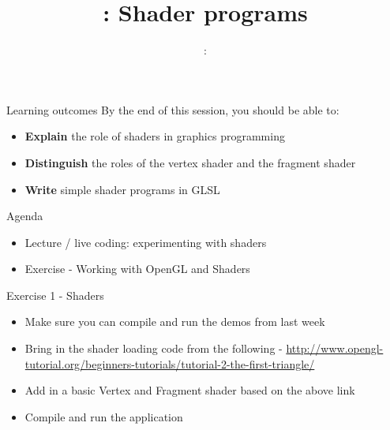 \usepackage{../../beamerthemeFalmouthGamesAcademy}
\usepackage{multimedia}
\graphicspath{ {../../} }




\usepackage[normalem]{ulem}
\usepackage{wasysym}

\usepackage{pdfpages}

\usetikzlibrary{arrows,automata}




\title{\sessionnumber: Shader programs}
\subtitle{\modulecode: \moduletitle}

\frame{\titlepage} 

\begin{frame}{Learning outcomes}
	By the end of this session, you should be able to:
	\begin{itemize}
		\item \textbf{Explain} the role of shaders in graphics programming
		\item \textbf{Distinguish} the roles of the vertex shader and the fragment shader
		\item \textbf{Write} simple shader programs in GLSL
	\end{itemize}
\end{frame}

\begin{frame}{Agenda}
	\begin{itemize}
		\item Lecture / live coding: experimenting with shaders
		\item Exercise - Working with OpenGL and Shaders
	\end{itemize}
\end{frame}





\begin{frame}{Exercise 1 - Shaders}
	\begin{itemize}
		\item Make sure you can compile and run the demos from last week
		\item Bring in the shader loading code from the following - \url{http://www.opengl-tutorial.org/beginners-tutorials/tutorial-2-the-first-triangle/}
		\item Add in a basic Vertex and Fragment shader based on the above link
		\item Compile and run the application
	\end{itemize}
\end{frame}

